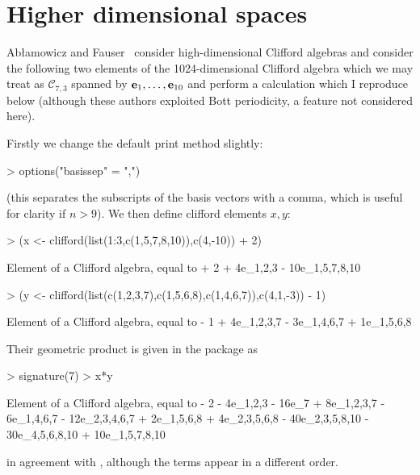 \documentclass{birkjour}
\theoremstyle{definition}
\theoremstyle{remark}
\numberwithin{equation}{section}
\renewenvironment{Schunk}{\vspace{20pt}}{\vspace{20pt}}
\begin{document}
\section{Higher dimensional spaces}

Ab\l{}amowicz and Fauser~\cite{ablamowicz2012} consider
high-dimensional Clifford algebras and consider the following two
elements of the 1024-dimensional Clifford algebra which we may treat
as ${\mathcal C}_{7,3}$ spanned by ${\bf e}_{1},\ldots,{\bf e}_{10}$ and perform
a calculation which I reproduce below (although these authors
exploited Bott periodicity, a feature not considered here).

Firstly we change the default print method slightly:

\begin{Schunk}
\begin{Sinput}
> options("basissep" = ",")
\end{Sinput}
\end{Schunk}
%
(this separates the subscripts of the basis vectors with a comma,
which is useful for clarity if $n>9$).  We then define clifford
elements $x,y$:

\begin{Schunk}
\begin{Sinput}
> (x <- clifford(list(1:3,c(1,5,7,8,10)),c(4,-10)) + 2)
\end{Sinput}
\begin{Soutput}
Element of a Clifford algebra, equal to
+ 2 + 4e_1,2,3 - 10e_1,5,7,8,10
\end{Soutput}
\begin{Sinput}
> (y <- clifford(list(c(1,2,3,7),c(1,5,6,8),c(1,4,6,7)),c(4,1,-3)) - 1)
\end{Sinput}
\begin{Soutput}
Element of a Clifford algebra, equal to
- 1 + 4e_1,2,3,7 - 3e_1,4,6,7 + 1e_1,5,6,8
\end{Soutput}
\end{Schunk}
%
Their geometric product is given in the package as

\begin{Schunk}
\begin{Sinput}
> signature(7)
> x*y
\end{Sinput}
\begin{Soutput}
Element of a Clifford algebra, equal to
- 2 - 4e_1,2,3 - 16e_7 + 8e_1,2,3,7 - 6e_1,4,6,7 - 12e_2,3,4,6,7 +
2e_1,5,6,8 + 4e_2,3,5,6,8 - 40e_2,3,5,8,10 - 30e_4,5,6,8,10 +
10e_1,5,7,8,10
\end{Soutput}
\end{Schunk}
%
in agreement with \cite{ablamowicz2012}, although the terms appear in
a different order.
\end{document}
